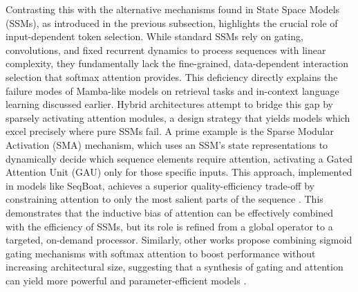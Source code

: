 \documentclass[11pt]{article}
\begin{document}
Contrasting this with the alternative mechanisms found in State Space Models (SSMs), as introduced in the previous subsection, highlights the crucial role of input-dependent token selection. While standard SSMs rely on gating, convolutions, and fixed recurrent dynamics to process sequences with linear complexity, they fundamentally lack the fine-grained, data-dependent interaction selection that softmax attention provides. This deficiency directly explains the failure modes of Mamba-like models on retrieval tasks and in-context language learning discussed earlier. Hybrid architectures attempt to bridge this gap by sparsely activating attention modules, a design strategy that yields models which excel precisely where pure SSMs fail. A prime example is the Sparse Modular Activation (SMA) mechanism, which uses an SSM's state representations to dynamically decide which sequence elements require attention, activating a Gated Attention Unit (GAU) only for those specific inputs. This approach, implemented in models like SeqBoat, achieves a superior quality-efficiency trade-off by constraining attention to only the most salient parts of the sequence \cite{ref97}. This demonstrates that the inductive bias of attention can be effectively combined with the efficiency of SSMs, but its role is refined from a global operator to a targeted, on-demand processor. Similarly, other works propose combining sigmoid gating mechanisms with softmax attention to boost performance without increasing architectural size, suggesting that a synthesis of gating and attention can yield more powerful and parameter-efficient models \cite{ref98}.
\end{document}
